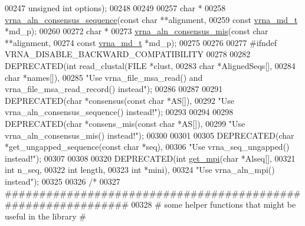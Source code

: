 \begin{DoxyCode}
00247                           \textcolor{keywordtype}{unsigned} \textcolor{keywordtype}{int}    options);
00248 
00249 
00257 \textcolor{keywordtype}{char} *
00258 \hyperlink{group__aln__utils_ga1f74eba3006fddd91195456ed1e58483}{vrna\_aln\_consensus\_sequence}(\textcolor{keyword}{const} \textcolor{keywordtype}{char}      **alignment,
00259                             \textcolor{keyword}{const} \hyperlink{group__model__details_structvrna__md__s}{vrna\_md\_t} *md\_p);
00260 
00272 \textcolor{keywordtype}{char} *
00273 \hyperlink{group__aln__utils_gad9e74f6549e819f5f330a06d57d45f2a}{vrna\_aln\_consensus\_mis}(\textcolor{keyword}{const} \textcolor{keywordtype}{char}       **alignment,
00274                        \textcolor{keyword}{const} \hyperlink{group__model__details_structvrna__md__s}{vrna\_md\_t}  *md\_p);
00275 
00276 
00277 \textcolor{preprocessor}{#ifndef VRNA\_DISABLE\_BACKWARD\_COMPATIBILITY}
00278 
00282 DEPRECATED(\textcolor{keywordtype}{int} read\_clustal(FILE  *clust,
00283                             \textcolor{keywordtype}{char}  *AlignedSeqs[],
00284                             \textcolor{keywordtype}{char}  *names[]),
00285           \textcolor{stringliteral}{"Use vrna\_file\_msa\_read() and vrna\_file\_msa\_read\_record() instead"});
00286 
00287 
00291 DEPRECATED(\textcolor{keywordtype}{char} *consensus(\textcolor{keyword}{const} \textcolor{keywordtype}{char} *AS[]),
00292           \textcolor{stringliteral}{"Use vrna\_aln\_consensus\_sequence() instead!"});
00293 
00294 
00298 DEPRECATED(\textcolor{keywordtype}{char} *consens\_mis(\textcolor{keyword}{const} \textcolor{keywordtype}{char} *AS[]),
00299           \textcolor{stringliteral}{"Use vrna\_aln\_consensus\_mis() instead!"});
00300 
00301 
00305 DEPRECATED(\textcolor{keywordtype}{char} *get\_ungapped\_sequence(\textcolor{keyword}{const} \textcolor{keywordtype}{char} *seq),
00306           \textcolor{stringliteral}{"Use vrna\_seq\_ungapped() instead!"});
00307 
00308 
00320 DEPRECATED(\textcolor{keywordtype}{int} \hyperlink{group__aln__utils__deprecated_gaa2d600be90844094ec145ea14a314d2f}{get\_mpi}(\textcolor{keywordtype}{char} *Alseq[],
00321                        \textcolor{keywordtype}{int}  n\_seq,
00322                        \textcolor{keywordtype}{int}  length,
00323                        \textcolor{keywordtype}{int}  *mini),
00324           \textcolor{stringliteral}{"Use vrna\_aln\_mpi() instead"});
00325 
00326 \textcolor{comment}{/*}
00327 \textcolor{comment}{ #############################################################}
00328 \textcolor{comment}{ # some helper functions that might be useful in the library #}

\end{DoxyCode}
